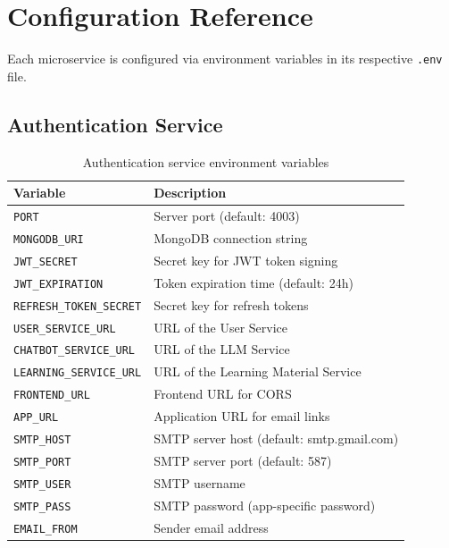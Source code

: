 \documentclass[a4paper,12pt]{report}
\begin{document}
\section{Configuration Reference}

Each microservice is configured via environment variables in its respective \texttt{.env} file.

\subsection{Authentication Service}
\begin{table}[H]
\centering
\begin{tabularx}{\textwidth}{lX}
    \toprule
    \textbf{Variable} & \textbf{Description} \\
    \midrule
    \texttt{PORT} & Server port (default: 4003) \\
    \texttt{MONGODB\_URI} & MongoDB connection string \\
    \texttt{JWT\_SECRET} & Secret key for JWT token signing \\
    \texttt{JWT\_EXPIRATION} & Token expiration time (default: 24h) \\
    \texttt{REFRESH\_TOKEN\_SECRET} & Secret key for refresh tokens \\
    \texttt{USER\_SERVICE\_URL} & URL of the User Service \\
    \texttt{CHATBOT\_SERVICE\_URL} & URL of the LLM Service \\
    \texttt{LEARNING\_SERVICE\_URL} & URL of the Learning Material Service \\
    \texttt{FRONTEND\_URL} & Frontend URL for CORS \\
    \texttt{APP\_URL} & Application URL for email links \\
    \texttt{SMTP\_HOST} & SMTP server host (default: smtp.gmail.com) \\
    \texttt{SMTP\_PORT} & SMTP server port (default: 587) \\
    \texttt{SMTP\_USER} & SMTP username \\
    \texttt{SMTP\_PASS} & SMTP password (app-specific password) \\
    \texttt{EMAIL\_FROM} & Sender email address \\
    \bottomrule
\end{tabularx}
\caption{Authentication service environment variables}
\end{table}
\end{document}
